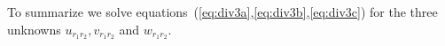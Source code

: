 \documentclass[12pt]{article}
\begin{document}
To summarize we solve equations~(\ref{eq:div3a},\ref{eq:div3b},\ref{eq:div3c}) for the
three unknowns $u_{r_1 r_2},v_{r_1 r_2}$ and $w_{r_1 r_2}$.

\baselineskip

% 
% 
% 
% 
\end{document}
